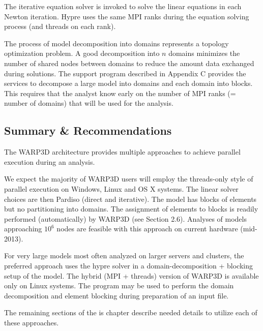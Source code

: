 The   iterative
equation solver is invoked to solve the linear equations in each Newton
iteration. Hypre uses the same MPI ranks during the equation solving
process (and threads on each rank).

The process of model decomposition into domains represents 
a topology optimization problem. A good decomposition into $n$ domains 
minimizes the number of shared nodes between domains to reduce the 
amount data exchanged during solutions. The  support program 
described in Appendix C provides the services to decompose a large model 
into domains and each domain into blocks. This requires that the 
analyst know early on the number of MPI ranks (= number of domains) 
that will be used for the analysis. 

\subsection{Summary \& Recommendations}
The WARP3D architecture provides multiple approaches to achieve
parallel execution during an analysis.

We expect the majority of WARP3D users will employ the threads-only
style of parallel execution on Windows, Linux and OS X systems. The
linear solver choices are then Pardiso (direct and iterative). The model
has blocks of elements but no partitioning into domains. The assignment of
elements to blocks is readily performed (automatically) by WARP3D (see Section 2.6).
Analyses of models approaching $10^6$ nodes are feasible with this
approach on current hardware (mid-2013).

For very large models most often analyzed on larger servers and clusters,
the preferred approach uses the hypre 
solver in a domain-decomposition + blocking setup of the model.
The hybrid (MPI + threads) version of WARP3D
is available only on Linux systems.
The  program may be used to perform the 
domain decomposition and element blocking during preparation of an
input file.

The remaining sections of the is chapter describe needed details
to utilize each of these approaches.


